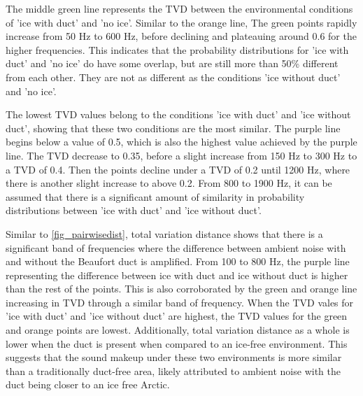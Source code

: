 The middle green line represents the TVD between the environmental conditions of 'ice with duct' and 'no ice'. Similar to the orange line, The green points rapidly increase from 50 Hz to 600 Hz, before declining and plateauing around 0.6 for the higher frequencies. This indicates that the probability distributions for 'ice with duct' and 'no ice' do have some overlap, but are still more than 50\% different from each other. They are not as different as the conditions 'ice without duct' and 'no ice'. 

The lowest TVD values belong to the conditions 'ice with duct' and 'ice without duct', showing that these two conditions are the most similar. The purple line begins below a value of 0.5, which is also the highest value achieved by the purple line. The TVD decrease to 0.35, before a slight increase from 150 Hz to 300 Hz to a TVD of 0.4. Then the points decline under a TVD of 0.2 until 1200 Hz, where there is another slight increase to above 0.2. From 800 to 1900 Hz, it can be assumed that there is a significant amount of similarity in probability distributions between 'ice with duct' and 'ice without duct'. 

Similar to \autoref{fig_pairwisedist}, total variation distance shows that there is a significant band of frequencies where the difference between ambient noise with and without the Beaufort duct is amplified. From 100 to 800 Hz, the purple line representing the difference between ice with duct and ice without duct is higher than the rest of the points. This is also corroborated by the green and orange line increasing in TVD through a similar band of frequency. When the TVD vales for 'ice with duct' and 'ice without duct' are highest, the TVD values for the green and orange points are lowest. Additionally, total variation distance as a whole is lower when the duct is present when compared to an ice-free environment. This suggests that the sound makeup under these two environments is more similar than a traditionally duct-free area, likely attributed to ambient noise with the duct being closer to an ice free Arctic.





